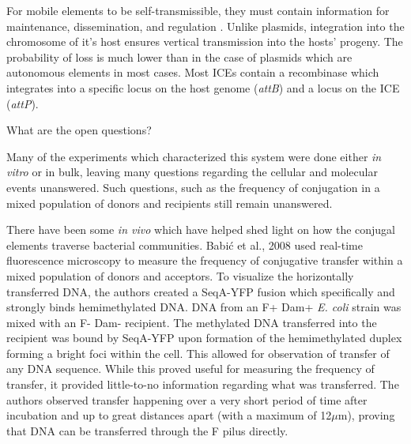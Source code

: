 For mobile elements to be self-transmissible, they must contain information for
maintenance, dissemination, and regulation \cite{Burrus:2004ca}. Unlike
plasmids, integration into the chromosome of it's host ensures vertical
transmission into the hosts' progeny. The probability of loss is much lower than
in the case of plasmids which are autonomous elements in most cases. Most ICEs
contain a recombinase which integrates into a specific locus on the host genome
(\textit{attB}) and a locus on the ICE (\textit{attP})\cite{Burrus:2004ca}.


What are the open questions?

%	
%	
%	
%

Many of the experiments which characterized this system were done either \textit{in
vitro} or in bulk, leaving many questions regarding the cellular and molecular
events unanswered. Such questions, such as the frequency of conjugation in a
mixed population of donors and recipients still remain unanswered.  

There have been some \textit{in vivo} which have helped shed light on how the
conjugal elements traverse bacterial communities. Babi\'{c} et al., 2008 used
real-time fluorescence microscopy to measure the frequency of conjugative
transfer within a mixed population of donors and acceptors. To visualize the
horizontally transferred DNA, the authors created a SeqA-YFP fusion which
specifically and strongly binds hemimethylated DNA. DNA from an F+ Dam+
\textit{E. coli} strain was mixed with an F- Dam- recipient. The
methylated DNA transferred into the recipient was bound by SeqA-YFP upon
formation of the hemimethylated duplex forming a bright foci within the cell.
This allowed for observation of transfer of any DNA sequence. While this proved
useful for measuring the frequency of transfer, it provided little-to-no
information regarding what was transferred. The authors observed transfer
happening over a very short period of time after incubation and up to great
distances apart (with a maximum of 12$\mu$m), proving that DNA can be
transferred through the F pilus directly.

